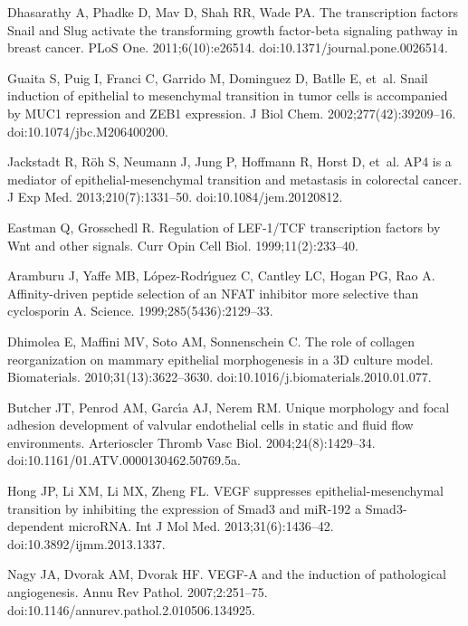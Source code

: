 \documentclass[11pt,letterpaper]{article}
\begin{document}
\begin{thebibliography}{10}
Dhasarathy A, Phadke D, Mav D, Shah RR, Wade PA.
\newblock The transcription factors Snail and Slug activate the transforming
  growth factor-beta signaling pathway in breast cancer.
\newblock PLoS One. 2011;6(10):e26514.
\newblock doi:{10.1371/journal.pone.0026514}.

Guaita S, Puig I, Franci C, Garrido M, Dominguez D, Batlle E, et~al.
\newblock Snail induction of epithelial to mesenchymal transition in tumor
  cells is accompanied by MUC1 repression and ZEB1 expression.
\newblock J Biol Chem. 2002;277(42):39209--16.
\newblock doi:{10.1074/jbc.M206400200}.

Jackstadt R, R{\"o}h S, Neumann J, Jung P, Hoffmann R, Horst D, et~al.
\newblock AP4 is a mediator of epithelial-mesenchymal transition and metastasis
  in colorectal cancer.
\newblock J Exp Med. 2013;210(7):1331--50.
\newblock doi:{10.1084/jem.20120812}.

Eastman Q, Grosschedl R.
\newblock Regulation of LEF-1/TCF transcription factors by Wnt and other
  signals.
\newblock Curr Opin Cell Biol. 1999;11(2):233--40.

Aramburu J, Yaffe MB, L{\'o}pez-Rodr{\'\i}guez C, Cantley LC, Hogan PG, Rao A.
\newblock Affinity-driven peptide selection of an NFAT inhibitor more selective
  than cyclosporin A.
\newblock Science. 1999;285(5436):2129--33.

Dhimolea E, Maffini MV, Soto AM, Sonnenschein C.
\newblock The role of collagen reorganization on mammary epithelial
  morphogenesis in a 3D culture model.
\newblock Biomaterials. 2010;31(13):3622--3630.
\newblock doi:{10.1016/j.biomaterials.2010.01.077}.

Butcher JT, Penrod AM, Garc{\'\i}a AJ, Nerem RM.
\newblock Unique morphology and focal adhesion development of valvular
  endothelial cells in static and fluid flow environments.
\newblock Arterioscler Thromb Vasc Biol. 2004;24(8):1429--34.
\newblock doi:{10.1161/01.ATV.0000130462.50769.5a}.

Hong JP, Li XM, Li MX, Zheng FL.
\newblock VEGF suppresses epithelial-mesenchymal transition by inhibiting the
  expression of Smad3 and miR-192 a Smad3-dependent microRNA.
\newblock Int J Mol Med. 2013;31(6):1436--42.
\newblock doi:{10.3892/ijmm.2013.1337}.

Nagy JA, Dvorak AM, Dvorak HF.
\newblock VEGF-A and the induction of pathological angiogenesis.
\newblock Annu Rev Pathol. 2007;2:251--75.
\newblock doi:{10.1146/annurev.pathol.2.010506.134925}.


\end{thebibliography}
\end{document}
